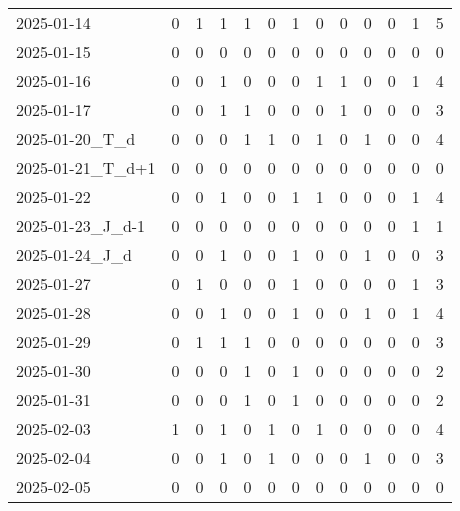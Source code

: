 \documentclass[dvipdfmx,oneside]{article}
\begin{document}
\begin{longtable}{lcccccccccccc}
        2025-01-14 &     0 &     1 &     1 &     1 &     0 &     1 &     0 &     0 &     0 &     0 &     1 &      5 \\
        2025-01-15 &     0 &     0 &     0 &     0 &     0 &     0 &     0 &     0 &     0 &     0 &     0 &      0 \\
        2025-01-16 &     0 &     0 &     1 &     0 &     0 &     0 &     1 &     1 &     0 &     0 &     1 &      4 \\
        2025-01-17 &     0 &     0 &     1 &     1 &     0 &     0 &     0 &     1 &     0 &     0 &     0 &      3 \\
  2025-01-20\_T\_d &     0 &     0 &     0 &     1 &     1 &     0 &     1 &     0 &     1 &     0 &     0 &      4 \\
2025-01-21\_T\_d+1 &     0 &     0 &     0 &     0 &     0 &     0 &     0 &     0 &     0 &     0 &     0 &      0 \\
        2025-01-22 &     0 &     0 &     1 &     0 &     0 &     1 &     1 &     0 &     0 &     0 &     1 &      4 \\
2025-01-23\_J\_d-1 &     0 &     0 &     0 &     0 &     0 &     0 &     0 &     0 &     0 &     0 &     1 &      1 \\
  2025-01-24\_J\_d &     0 &     0 &     1 &     0 &     0 &     1 &     0 &     0 &     1 &     0 &     0 &      3 \\
        2025-01-27 &     0 &     1 &     0 &     0 &     0 &     1 &     0 &     0 &     0 &     0 &     1 &      3 \\
        2025-01-28 &     0 &     0 &     1 &     0 &     0 &     1 &     0 &     0 &     1 &     0 &     1 &      4 \\
        2025-01-29 &     0 &     1 &     1 &     1 &     0 &     0 &     0 &     0 &     0 &     0 &     0 &      3 \\
        2025-01-30 &     0 &     0 &     0 &     1 &     0 &     1 &     0 &     0 &     0 &     0 &     0 &      2 \\
        2025-01-31 &     0 &     0 &     0 &     1 &     0 &     1 &     0 &     0 &     0 &     0 &     0 &      2 \\
        2025-02-03 &     1 &     0 &     1 &     0 &     1 &     0 &     1 &     0 &     0 &     0 &     0 &      4 \\
        2025-02-04 &     0 &     0 &     1 &     0 &     1 &     0 &     0 &     0 &     1 &     0 &     0 &      3 \\
        2025-02-05 &     0 &     0 &     0 &     0 &     0 &     0 &     0 &     0 &     0 &     0 &     0 &      0 \\

\end{longtable}
\end{document}
